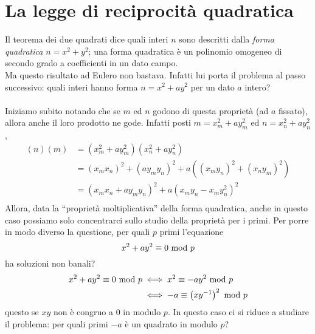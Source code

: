 \section{La legge di reciprocità quadratica}
\label{lezione12}
Il teorema dei due quadrati dice quali interi $n$ sono descritti dalla \textit{forma quadratica} $n=x^2+y^2$; una forma quadratica è un polinomio omogeneo di secondo grado a coefficienti in un dato campo. \\ Ma questo risultato ad Eulero non bastava. Infatti lui porta il problema al passo successivo: quali interi hanno forma $n=x^2+ay^2$ per un dato $a$ intero? \\ \\
Iniziamo subito notando che se $m$ ed $n$ godono di questa proprietà (ad $a$ fissato), allora anche il loro prodotto ne gode. Infatti posti $m=x_m^2+ay_m^2$ ed $n=x_n^2+ay_n^2$,
\begin{align*}
(n)(m)
&=\left(x_m^2+ay_m^2\right)\left(x_n^2+ay_n^2\right)\\
&=\left(x_mx_n\right)^2+\left(ay_my_n\right)^2+a\left(\left(x_my_n\right)^2+\left(x_ny_m\right)^2\right)\\
&=\left(x_mx_n+ay_my_n\right)^2+a\left(x_my_n-x_my_n^2\right)^2\\
\end{align*}
Allora, data la \enquote{proprietà moltiplicativa} della forma quadratica, anche in questo caso possiamo solo concentrarci sullo studio della proprietà per i primi. Per porre in modo diverso la questione, per quali $p$ primi l'equazione 
\begin{equation*}
x^2+ay^2\equiv0\ \mathrm{mod}\ p
\end{equation*}
ha soluzioni non banali? 
\begin{align*}
x^2+ay^2\equiv0\ \mathrm{mod}\ p
&\iff x^2\equiv -ay^2\ \mathrm{mod}\ p\\
&\iff -a\equiv \left(xy^{-1}\right)^2\ \mathrm{mod}\ p
\end{align*}
questo se $xy$ non è congruo a 0 in modulo $p$. In questo caso ci si riduce a studiare il problema: per quali primi $-a$ è un quadrato in modulo $p$?
